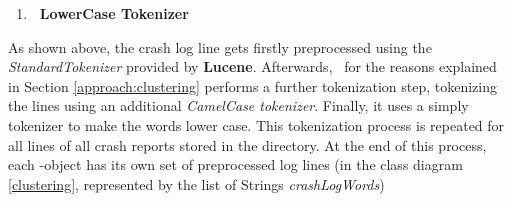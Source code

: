 \begin{enumerate}
\item \textbf{\toolname\ LowerCase Tokenizer} \\ \vspace{0.3em}
\end{enumerate}
As shown above, the crash log line gets firstly preprocessed using the \textit{StandardTokenizer} provided by \textbf{Lucene}.
Afterwards, \toolname\ for the reasons explained in Section \ref{approach:clustering} performs a further tokenization step, tokenizing the lines using an additional \textit{CamelCase tokenizer}. 
Finally, it uses a simply tokenizer to make the words lower case. 
This tokenization process is repeated for all lines of all crash reports stored in the directory. At the end of this process, each \Crash-object has its own set of preprocessed log lines (in the class diagram \ref{clustering}, represented by the list of Strings \textit{crashLogWords})

